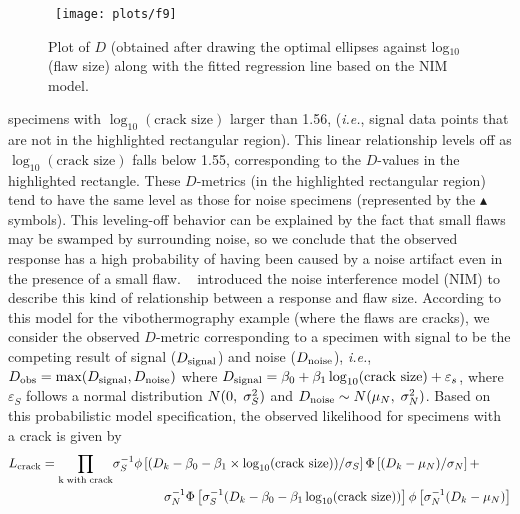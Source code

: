 \documentclass[12pt]{article}
\begin{document}
\begin{wrapfigure}{r}{0.5\textwidth}
\vspace{-0.525in}
\begin{center}
\mbox{
  \texttt{[image: plots/f9]}}
\end{center}
\vspace{-0.3in}
\caption{Plot  of $D$ (obtained after drawing the optimal
  ellipses %
  against  log${}_{10}$(flaw size) along  with the fitted regression line
  based on the   NIM model.}
\label{f7}
\vspace{-0.2in}
\end{wrapfigure}
\hspace{-0.31in} specimens with $\log _{10}
 (\mbox{crack size})$ larger than 1.56, ({\em i.e.}, signal data
 points that are  not in the highlighted rectangular region). This
  linear relationship levels off as $\log _{10} (\mbox{crack size})$
 falls below 1.55, corresponding to the $D$-values in the
 highlighted rectangle.  These $D$-metrics (in the highlighted
                                rectangular region) 
tend to have the same level as those for noise
specimens (represented by the $\blacktriangle$ symbols). This
leveling-off behavior can be explained by the fact that 
small flaws may be swamped by surrounding
   noise, so we conclude that the observed  response has a high
   probability of having been caused by a noise 
   artifact even in the presence of a small flaw. ~\citet{liandmeeker09}
   introduced the noise    interference model (NIM) 
   to describe this kind of relationship between a response and flaw
   size. According to this model for the vibothermography example
   (where the flaws are cracks), we consider the observed $D$-metric
   corresponding to a specimen with signal to be the competing result
   of signal ($D_{{\rm signal}} $) and noise ($D_{{\rm noise}} $),
   {\em i.e.}, $D_{{\rm obs}} =\max (D_{{\rm signal}} ,D_{{\rm
       noise}})$ where  $D_{{\rm signal}} =\beta _{0} +\beta _{1} \log
   _{10} (\mbox{crack size})+\varepsilon_{s}$,
where  $\varepsilon_{S} $ follows a normal distribution $N(0,{\rm \;
}\sigma _{S}^{2} )$ and $D_{{\rm noise}} \sim N(\mu _{N} ,{\rm \;
}\sigma _{N}^{2} )$. Based on this probabilistic model specification,
the observed likelihood for  specimens with a crack is given by
\begin{equation}
\begin{split}
L_{{\rm crack}} =\prod _{{\rm k\; with\; crack}} & {\sigma^{-1}_{S}}
  \phi\left[({D_{k} -\beta _{0} -\beta _{1} \times \log_{10}
      (\mbox{crack size})})/{\sigma _{S}} \right] \Phi\left[(D_{k} -\mu _{N})/\sigma _{N}
\right]+  \\
& \qquad \qquad
\sigma^{-1}_{N}  \Phi\left[\sigma_S^{-1}(D_{k} -\beta _{0} -\beta
      _{1} \log_{10} (\mbox{crack size}))\right]\phi
  \left[\sigma_N^{-1}(D_{k} -\mu _{N})\right] \\
\end{split}
\end{equation}
\end{document}
